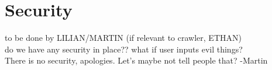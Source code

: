 \section{Security}
to be done by LILIAN/MARTIN (if relevant to crawler, ETHAN)\\
do we have any security in place?? what if user inputs evil things?\\
There is no security, apologies. Let's maybe not tell people that? -Martin
